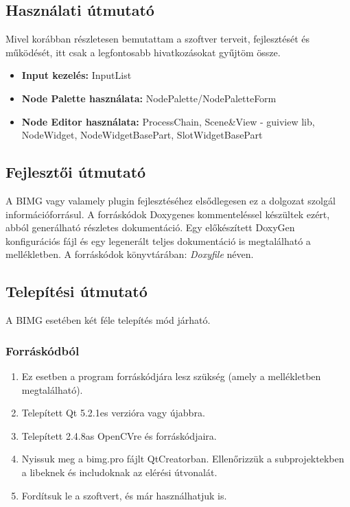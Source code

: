 \documentclass[a4paper,12pt,oneside]{report}
\begin{document}
\subsection{Használati útmutató}
Mivel korábban részletesen bemutattam a szoftver terveit, fejlesztését és működését, itt csak a legfontosabb hivatkozásokat gyűjtöm össze.
\begin{itemize}
	\itemsep0em
	\item \textbf{Input kezelés:}  InputList
	\item \textbf{Node Palette használata:}  NodePalette/NodePaletteForm
	\item \textbf{Node Editor használata:} ProcessChain, Scene\&View - guiview lib, NodeWidget, NodeWidgetBasePart, SlotWidgetBasePart
\end{itemize}

\subsection{Fejlesztői útmutató}
A BIMG vagy valamely plugin fejlesztéséhez elsődlegesen ez a dolgozat szolgál információforrásul. A forráskódok Doxygenes kommenteléssel készültek ezért, abból generálható részletes dokumentáció. Egy előkészített DoxyGen konfigurációs fájl és egy legenerált teljes dokumentáció is megtalálható a mellékletben. A forráskódok könyvtárában: \emph{Doxyfile} néven.
\subsection{Telepítési útmutató}
A BIMG esetében két féle telepítés mód járható.
\subsubsection{Forráskódból}
\begin{enumerate}
\itemsep0em
\item Ez esetben a program forráskódjára lesz szükség (amely a mellékletben megtalálható).
\item Telepített Qt 5.2.1es verzióra vagy újabbra.
\item Telepített 2.4.8as OpenCVre és forráskódjaira.
\item Nyissuk meg a bimg.pro fájlt QtCreatorban. Ellenőrizzük a subprojektekben a libeknek és includoknak az elérési útvonalát.
\item Fordítsuk le a szoftvert, és már használhatjuk is.
\end{enumerate}
\end{document}

